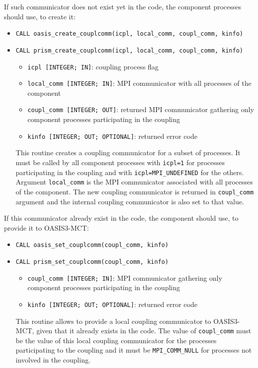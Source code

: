 If such communicator does not exist yet in the code, the component processes should use, to create it: 

\begin{itemize}
\item {\tt CALL oasis\_create\_couplcomm(icpl, local\_comm, coupl\_comm, kinfo)} 
\item {\tt CALL prism\_create\_couplcomm(icpl, local\_comm, coupl\_comm, kinfo)}
\begin{itemize}
\item {\tt icpl [INTEGER; IN]}: coupling process flag
\item {\tt local\_comm [INTEGER; IN]}: MPI communicator with all processes of the component
\item {\tt coupl\_comm [INTEGER; OUT]}: returned MPI communicator gathering only component processes participating in the coupling
\item {\tt kinfo [INTEGER; OUT; OPTIONAL]}: returned error code
\end{itemize}

This routine creates a coupling communicator for a subset of processes. It must be called by all component processes with {\tt icpl=1} for processes participating in the coupling and with {\tt icpl=MPI\_UNDEFINED} for the others. Argument {\tt local\_comm} is the MPI communicator associated with all processes of the component. The new coupling communicator is returned in {\tt coupl\_comm} argument and the internal coupling communicator is also set to that value.  
\end{itemize}

If this communicator already exist in the code, the component should use, to provide it to OASIS3-MCT:  

\begin{itemize} 
\item {\tt CALL oasis\_set\_couplcomm(coupl\_comm, kinfo)}
\item {\tt CALL prism\_set\_couplcomm(coupl\_comm, kinfo)}
\begin{itemize}
\item {\tt coupl\_comm [INTEGER; IN]}: MPI communicator gathering only component processes participating in the coupling
\item {\tt kinfo [INTEGER; OUT; OPTIONAL]}: returned error code
\end{itemize}

This routine allows to provide a local coupling communicator to OASIS3-MCT, given that it already exists in the code. The value of {\tt coupl\_comm} must be the value of this local coupling communicator for the processes participating to the coupling and it must be {\tt MPI\_COMM\_NULL} for processes not involved in the coupling.  
\end{itemize}

